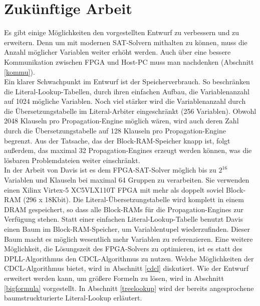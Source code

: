 \section{Zukünftige Arbeit}
Es gibt einige Möglichkeiten den vorgestellten Entwurf
zu verbessern und zu erweitern. Denn um mit modernen SAT-Solvern
mithalten zu können, muss die Anzahl möglicher Variablen
weiter erhöht werden. Auch über eine bessere Kommunikation zwischen
FPGA und Host-PC muss man nachdenken (Abschnitt \ref{kommu}).\\
Ein klarer Schwachpunkt im Entwurf ist der Speicherverbrauch.
So beschränken die Literal-Lookup-Tabellen, durch ihren 
einfachen Aufbau, die Variablenanzahl auf 1024 mögliche Variablen.
Noch viel stärker wird die Variablenanzahl durch die 
Übersetzungstabelle im Literal-Arbiter eingeschränkt (256 Variablen).
Obwohl 2048 Klauseln pro Propagation-Engine
möglich wären, wird auch deren Zahl durch die Übersetzungstabelle
auf 128 Klauseln pro Propagation-Engine begrenzt. Aus der Tatsache,
das der Block-RAM-Speicher knapp ist, folgt außerdem, das maximal 32 Propagation-Engines
erzeugt werden können, was die lösbaren Problemdateien weiter
einschränkt.\\
In der Arbeit von Davis \cite{davis:2008} ist es dem FPGA-SAT-Solver
möglich bis zu $2^{16}$ Variablen und Klauseln bei maximal 64
Gruppen zu verarbeiten. Sie verwenden einen Xilinx Virtex-5 
XC5VLX110T FPGA mit mehr als doppelt soviel Block-RAM (296 x 18Kbit).
Die Literal-Übersetzungstabelle wird komplett in einem
DRAM gespeichert, so dass alle Block-RAMs für die Propagation-Engines
zur Verfügung stehen. Statt einer einfachen Literal-Lookup-Tabelle
benutzt Davis einen Baum im Block-RAM-Speicher, 
um Variablentupel wiederzufinden. Dieser Baum macht es möglich
wesentlich mehr Variablen zu referenzieren. 
Eine weitere Möglichkeit, die Lösungszeit des FPGA-Solvers
zu optimieren, ist es statt des DPLL-Algorithmus den CDCL-Algorithmus zu
nutzen. Welche Möglichkeiten der CDCL-Algorithmus bietet,  
wird in Abschnitt \ref{cdcl} diskutiert.
Wie der Entwurf erweitert werden kann, 
um größere Formeln zu lösen, wird in Abschnitt \ref{bigformula} 
vorgestellt. In Abschnitt \ref{treelookup} wird der bereits
angesprochene baumstruckturierte Literal-Lookup erläutert.

